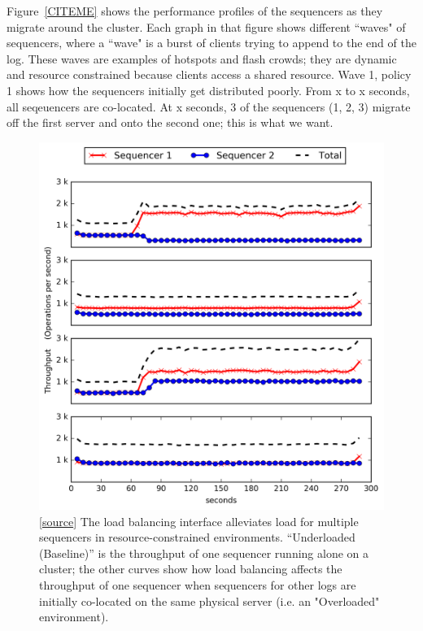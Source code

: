 \documentclass[preprint]{sigplanconf-eurosys}
\begin{document}
Figure~\ref{CITEME} shows the performance profiles of the sequencers as they
migrate around the cluster. Each graph in that figure shows different ``waves"
of sequencers, where a ``wave" is a burst of clients trying to append to the
end of the log. These waves are examples of hotspots and flash crowds; they are
dynamic and resource constrained because clients access a shared resource. Wave
1, policy 1 shows how the sequencers initially get distributed poorly. From x
to x seconds, all seqeuencers are co-located. At x seconds, 3 of the sequencers
(1, 2, 3) migrate off the first server and onto the second one; this is what we
want.

\begin{figure}[t!]
\centering
\includegraphics{figures/mantle-balancer-profiles.png}
\caption{[\href{https://github.com/double-blind-submitter/osdi16}{source}] The
load balancing interface alleviates load for multiple sequencers in
resource-constrained environments.  ``Underloaded (Baseline)'' is the
throughput of one sequencer running alone on a cluster; the other curves show
how load balancing affects the throughput of one sequencer when sequencers for
other logs are initially co-located on the same physical server (i.e. an
"Overloaded" environment).}\label{fig:mantle-seq-thruput}
\end{figure}
\end{document}
